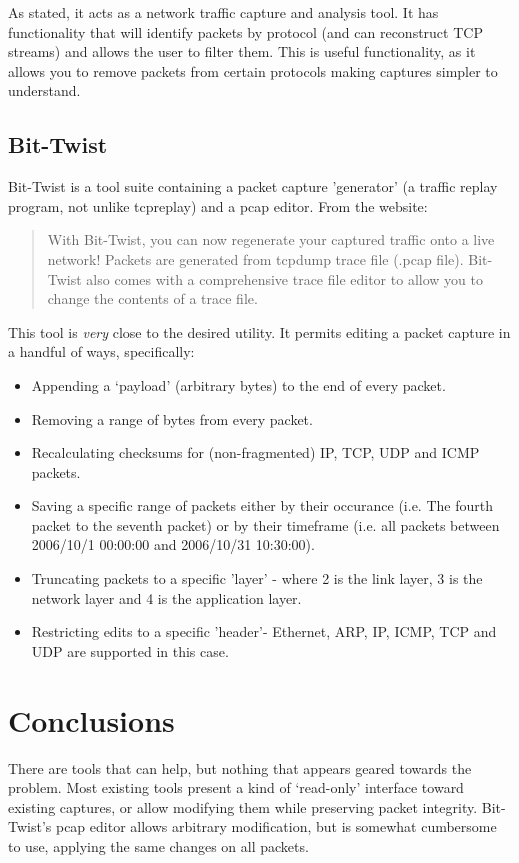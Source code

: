 \documentclass[10pt,a4paper,notitlepage]{report}
\begin{document}
As stated, it acts as a network traffic capture and analysis tool. It has functionality that will identify packets by protocol (and can reconstruct TCP streams) and allows the user to filter them. This is useful functionality, as it allows you to remove packets from certain protocols making captures simpler to understand.

\subsection{Bit-Twist}
Bit-Twist is a tool suite containing a packet capture 'generator' (a traffic replay program, not unlike tcpreplay\cite{tcpreplay-web}) and a pcap editor.
From the website\cite{bittwist-web}:

\begin{quote}
With Bit-Twist, you can now regenerate your captured traffic onto a live network! Packets are generated from tcpdump trace file (.pcap file). Bit-Twist also comes with a comprehensive trace file editor to allow you to change the contents of a trace file.
\end{quote}

This tool is \emph{very} close to the desired utility. It permits editing a packet capture in a handful of ways, specifically:
\begin{itemize}
\item Appending a `payload' (arbitrary bytes) to the end of every packet.
\item Removing a range of bytes from every packet.
\item Recalculating checksums for (non-fragmented) IP, TCP, UDP and ICMP packets.
\item Saving a specific range of packets either by their occurance (i.e. The fourth packet to the seventh packet) or by their timeframe (i.e. all packets between 2006/10/1 00:00:00 and 2006/10/31 10:30:00).
\item Truncating packets to a specific 'layer' - where 2 is the link layer, 3 is the network layer and 4 is the application layer.
\item Restricting edits to a specific 'header'- Ethernet, ARP, IP, ICMP, TCP and UDP are supported in this case.
\end{itemize}

\section{Conclusions}
There are tools that can help, but nothing that appears geared towards the problem. Most existing tools present a kind of `read-only' interface toward existing captures, or allow modifying them while preserving packet integrity. Bit-Twist's pcap editor allows arbitrary modification, but is somewhat cumbersome to use, applying the same changes on all packets.
\end{document}

